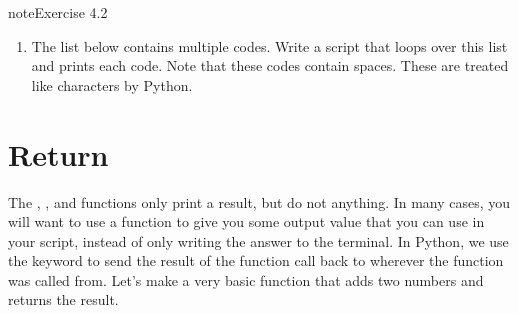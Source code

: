 \documentclass[letterpaper,10pt,english]{jupyterBook}
\begin{document}
\begin{sphinxadmonition}{note}{Exercise 4.2}
\begin{enumerate}
\item {} 
\sphinxAtStartPar
The list below contains multiple codes. Write a script that loops over this list and prints each code. Note that these codes contain spaces. These are treated like characters by Python.

\begin{sphinxVerbatim}[commandchars=\\\{\}]
  \PYG{p}{[} 
             \PYG{p}{]}
\end{sphinxVerbatim}

\end{enumerate}
\end{sphinxadmonition}


\section{Return}
\label{\detokenize{notebooks/04_Functions/04_Functions_student:return}}
\sphinxAtStartPar
The , , and  functions only print a result, but do not  anything. In many cases, you will want to use a function to give you some output value that you can use in your script, instead of only writing the answer to the terminal. In Python, we use the keyword  to send the result of the function call back to wherever the function was called from. Let’s make a very basic function that adds two numbers and returns the result.
\end{document}
